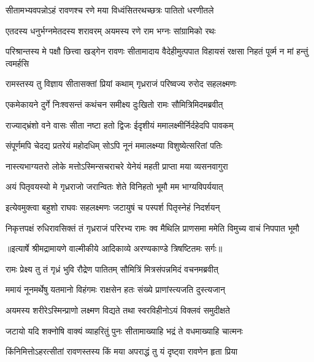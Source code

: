 \twolineshloka
{सीतामभ्यवपन्नोऽहं रावणश्च रणे मया}
{विध्वंसितरथच्छत्रः पातितो धरणीतले} %

\twolineshloka
{एतदस्य धनुर्भग्नमेतदस्य शरावरम्}
{अयमस्य रणे राम भग्नः सांग्रामिको रथः} %

\threelineshloka
{परिश्रान्तस्य मे पक्षौ छित्त्वा खड्गेन रावणः}
{सीतामादाय वैदेहीमुत्पपात विहायसं}
{रक्षसा निहतं पूर्व्म न मां हन्तुं त्वमर्हसि} %

\twolineshloka
{रामस्तस्य तु विज्ञाय सीतासक्तां प्रियां कथाम्}
{गृध्रराजं परिष्वज्य रुरोद सहलक्ष्मणः} %

\twolineshloka
{एकमेकायने दुर्गे निःश्वसन्तं कथंचन}
{समीक्ष्य दुःखितो रामः सौमित्रिमिदमब्रवीत्} %

\twolineshloka
{राज्याद्भ्रंशो वने वासः सीता नष्टा हतो द्विजः}
{ईदृशीयं ममालक्ष्मीर्निर्दहेदपि पावकम्} %

\twolineshloka
{संपूर्णमपि चेदद्य प्रतरेयं महोदधिम्}
{सोऽपि नूनं ममालक्ष्म्या विशुष्येत्सरितां पतिः} %

\twolineshloka
{नास्त्यभाग्यतरो लोके मत्तोऽस्मिन्सचराचरे}
{येनेयं महती प्राप्ता मया व्यसनवागुरा} %

\twolineshloka
{अयं पितृवयस्यो मे गृध्रराजो जरान्वितः}
{शेते विनिहतो भूमौ मम भाग्यविपर्ययात्} %

\twolineshloka
{इत्येवमुक्त्वा बहुशो राघवः सहलक्ष्मणः}
{जटायुषं च पस्पर्श पितृस्नेहं निदर्शयन्} %

\fourlineindentedshloka
{निकृत्तपक्षं रुधिरावसिक्तं}
{ तं गृध्रराजं परिरभ्य रामः}
{क्व मैथिलि प्राणसमा ममेति}
{ विमुच्य वाचं निपपात भूमौ} %


{॥इत्यार्षे श्रीमद्रामायणे वाल्मीकीये आदिकाव्ये अरण्यकाण्डे त्रिषष्टितमः सर्गः॥}


\twolineshloka
{रामः प्रेक्ष्य तु तं गृध्रं भुवि रौद्रेण पातितम्}
{सौमित्रिं मित्रसंपन्नमिदं वचनमब्रवीत्} %

\twolineshloka
{ममायं नूनमर्थेषु यतमानो विहंगमः}
{राक्षसेन हतः संख्ये प्राणांस्त्यजति दुस्त्यजान्} %

\twolineshloka
{अयमस्य शरीरेऽस्मिन्प्राणो लक्ष्मण विद्यते}
{तथा स्वरविहीनोऽयं विक्लवं समुदीक्षते} %

\twolineshloka
{जटायो यदि शक्नोषि वाक्यं व्याहरितुं पुनः}
{सीतामाख्याहि भद्रं ते वधमाख्याहि चात्मनः} %

\twolineshloka
{किंनिमित्तोऽहरत्सीतां रावणस्तस्य किं मया}
{अपराद्धं तु यं दृष्ट्वा रावणेन हृता प्रिया} %

